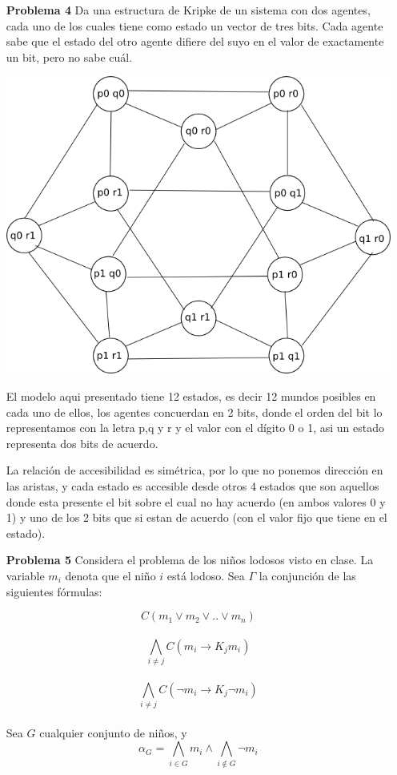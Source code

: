 \documentclass{article}
\begin{document}
\begin{enumerate}
\item[\bf{Problema 4}] Da una estructura de Kripke de un sistema con dos agentes, cada uno de los cuales tiene como estado un vector de tres bits. Cada agente sabe que el estado del otro agente difiere del suyo en el valor de exactamente un bit, pero no sabe cuál.

\begin{center}
  \includegraphics[scale=0.5]{e4_4.png}\\
\end{center}

El modelo aqui presentado tiene 12 estados, es decir 12 mundos posibles en cada uno de ellos, los agentes concuerdan en 2 bits, donde el orden del bit lo representamos con la letra p,q y r y el valor con el dígito 0 o 1, asi un estado representa dos bits de acuerdo.

La relación de accesibilidad es simétrica, por lo que no ponemos dirección en las aristas, y cada estado es accesible desde otros 4 estados que son aquellos donde esta presente el bit sobre el cual no hay acuerdo (en ambos valores 0 y 1) y uno de los 2 bits que si estan de acuerdo (con el valor fijo que tiene en el estado). 


\item[\bf{Problema 5}]  Considera el problema de los niños lodosos visto en clase. La variable $m_i$ denota que el niño $i$ está lodoso. Sea $\Gamma$ la conjunción de las siguientes
fórmulas:

$$C(m_1 \vee m_2 \vee .. \vee  m_n)$$\\
$$ \bigwedge\limits_{i\neq j}C(m_i \rightarrow K_jm_i) $$\\
$$ \bigwedge\limits_{i\neq j}C(\neg m_i \rightarrow K_j \neg m_i) $$\\
Sea $G$ cualquier conjunto de niños, y
$$  \alpha_G = \bigwedge\limits_{i\in G} m_i  \wedge \bigwedge\limits_{i \not \in G} \neg m_i $$


\end{enumerate}
\end{document}
